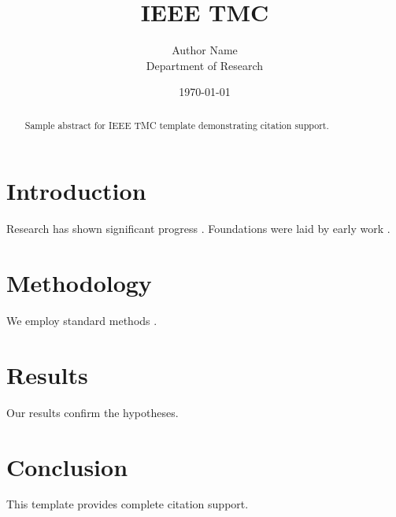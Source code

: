 ﻿\documentclass{IEEEtran}
\title{IEEE TMC}
\author{Author Name \\ \small Department of Research}
\date{\today}
\begin{document}
\maketitle

\begin{abstract}
Sample abstract for IEEE TMC template demonstrating citation support.
\end{abstract}

\section{Introduction}
Research has shown significant progress \citep{einstein1905}. Foundations were laid by early work \citep{turing1950}.

\section{Methodology}
We employ standard methods \citep{knuth1984}.

\section{Results}
Our results confirm the hypotheses.

\section{Conclusion}
This template provides complete citation support.



\end{document}
